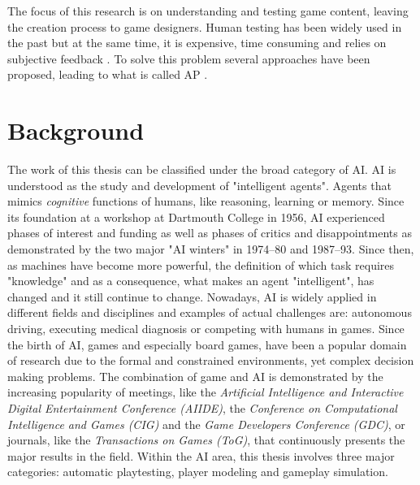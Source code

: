 The focus of this research is on understanding and testing game content, leaving the creation process to game designers. Human testing has been widely used in the past but at the same time, it is expensive, time consuming and relies on subjective feedback \cite{zook_automatic_2014}. To solve this problem several approaches have been proposed, leading to what is called \acl{AP} \cite{silva_ai_2017}.

\section{Background} \label{Background_intro}

The work of this thesis can be classified under the broad category of \acf{AI}. \acs{AI} is understood as the study and development of "intelligent agents". Agents that mimics \textit{cognitive} functions of humans, like reasoning, learning or memory. Since its foundation at a workshop at Dartmouth College in 1956, \acs{AI} experienced phases of interest and funding as well as phases of critics and disappointments as demonstrated by the two major "AI winters" in 1974–80 and 1987–93. Since then, as machines have become more powerful, the definition of which task requires "knowledge" and as a consequence, what makes an agent "intelligent", has changed and it still continue to change. Nowadays, \acs{AI} is widely applied in different fields and disciplines and examples of actual challenges are: autonomous driving, executing medical diagnosis or competing with humans in games. Since the birth of \acs{AI}, games and especially board games, have been a popular domain of research \cite{yannakakis_artificial_2017} due to the formal and constrained environments, yet complex decision making problems. The combination of game and \acs{AI} is demonstrated by the increasing popularity of meetings, like the \textit{Artificial Intelligence and Interactive Digital Entertainment Conference (AIIDE)}, the \textit{Conference on Computational Intelligence and Games (CIG)} and the \textit{Game Developers Conference (GDC)}, or journals, like the  \textit{Transactions on Games (ToG)}, that continuously presents the major results in the field. Within the \acs{AI} area, this thesis involves three major categories: automatic playtesting, player modeling and gameplay simulation.


